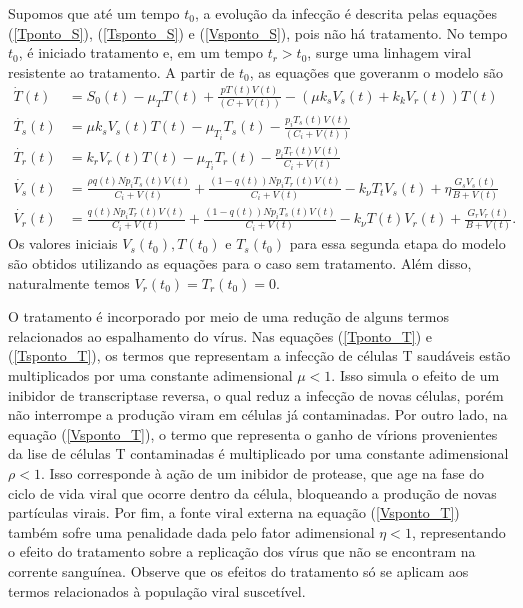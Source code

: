 Supomos que até um tempo \( t_{ 0 } \), a evolução da infecção é descrita pelas equações (\ref{Tponto_S}), (\ref{Tsponto_S}) e (\ref{Vsponto_S}), pois não há tratamento.
No tempo \( t_{ 0 } \), é iniciado tratamento e, em um tempo \( t_{ r } > t_{ 0 } \), surge uma linhagem viral resistente ao tratamento.
A partir de \( t_{ 0 } \), as equações que goveranm o modelo são
\begin{align}
    \dot{T}( t ) &= S_{ 0 } ( t ) - \mu_{ T } T ( t ) + \frac{ p T ( t ) V ( t ) }{ ( C + V ( t ) ) } - ( \mu k_{ s } V_{ s } ( t ) + k_{ k } V_{ r } ( t ) ) T ( t ) \label{Tponto_T}\\
    \dot{T_{ s }} ( t ) &= \mu k_{ s } V_{ s } ( t ) T ( t ) - \mu_{ T_{ i } } T_{ s } ( t ) - \frac{ p_{ i } T_{ s } ( t ) V ( t ) }{ ( C_{ i } + V ( t ) ) } \label{Tsponto_T} \\
    \dot{ T_{ r } } ( t ) &= k_{ r } V_{ r } ( t ) T ( t ) - \mu_{ T_{ i } } T_{ r } ( t ) - \frac{ p_{ i } T_{ r } ( t ) V ( t ) }{ C_{ i } + V ( t ) } \label{Trponto_T} \\
    \dot{V_{ s } } ( t ) &= \frac{ \rho q ( t ) N p_{ i } T_{ s } ( t ) V ( t ) }{ C_{ i } + V ( t ) } + \frac{ ( 1 - q ( t ) ) N p_{ i } T_{ r } ( t ) V ( t ) }{ C_{ i } + V ( t ) } - k_{ \nu } T_{ t } V_{ s } ( t ) + \eta \frac{ G_{ s } V_{ s } ( t ) }{ B + V ( t ) } \label{Vsponto_T} \\
    \dot{ V_{ r }} ( t ) &= \frac{ q ( t ) N p_{ i } T_{ r } ( t ) V ( t ) }{ C_{ i } + V ( t ) } + \frac{ ( 1 - q ( t ) ) N p_{ i } T_{ s } ( t ) V ( t ) }{ C_{ i } + V ( t ) } - k_{ \nu } T ( t ) V_{ r } ( t ) + \frac{ G_{ r } V_{ r } ( t ) }{ B + V ( t ) } \label{Vrponto_T}
.\end{align}
Os valores iniciais \( V_{ s } ( t_{ 0 } ), T ( t_{ 0 } ) \) e \( T_{ s } ( t_{ 0 } ) \) para essa segunda etapa do modelo são obtidos utilizando as equações para o caso sem tratamento.
Além disso, naturalmente temos \( V_{ r } ( t_{ 0 } ) = T_{ r } ( t_{ 0 } ) = 0 \).

O tratamento é incorporado por meio de uma redução de alguns termos relacionados ao espalhamento do vírus.
Nas equações (\ref{Tponto_T}) e (\ref{Tsponto_T}), os termos que representam a infecção de células T saudáveis estão multiplicados por uma constante adimensional \( \mu < 1 \).
Isso simula o efeito de um inibidor de transcriptase reversa, o qual reduz a infecção de novas células, porém não interrompe a produção viram em células já contaminadas.
Por outro lado, na equação (\ref{Vsponto_T}), o termo que representa o ganho de vírions provenientes da lise de células T contaminadas é multiplicado por uma constante adimensional \( \rho < 1 \).
Isso corresponde à ação de um inibidor de protease, que age na fase do ciclo de vida viral que ocorre dentro da célula, bloqueando a produção de novas partículas virais.
Por fim, a fonte viral externa na equação (\ref{Vsponto_T}) também sofre uma penalidade dada pelo fator adimensional \( \eta < 1 \), representando o efeito do tratamento sobre a replicação dos vírus que não se encontram na corrente sanguínea.
Observe que os efeitos do tratamento só se aplicam aos termos relacionados à população viral suscetível.

